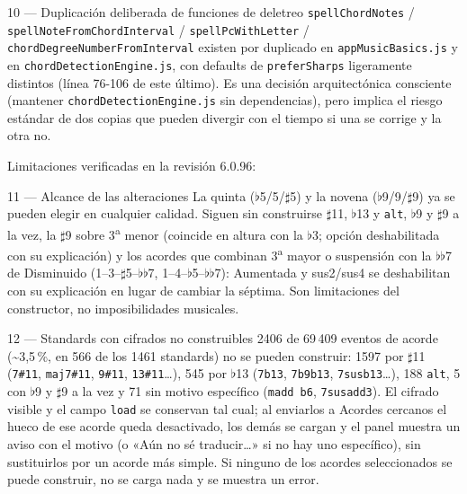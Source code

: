 \documentclass[a4paper,11pt,oneside]{report}
\newcommand{\flt}{\ensuremath{\flat}}
\newcommand{\shp}{\ensuremath{\sharp}}
\begin{document}
\begin{hallazgobox}{10 --- Duplicación deliberada de funciones de deletreo}
\lstinline!spellChordNotes! / \lstinline!spellNoteFromChordInterval! / \lstinline!spellPcWithLetter! / \lstinline!chordDegreeNumberFromInterval! existen por duplicado en \lstinline!appMusicBasics.js! y en \lstinline!chordDetectionEngine.js!, con defaults de \lstinline!preferSharps! ligeramente distintos (línea 76-106 de este último). Es una decisión arquitectónica consciente (mantener \lstinline!chordDetectionEngine.js! sin dependencias), pero implica el riesgo estándar de dos copias que pueden divergir con el tiempo si una se corrige y la otra no.
\end{hallazgobox}

\noindent Limitaciones verificadas en la revisión 6.0.96:

\begin{hallazgobox}{11 --- Alcance de las alteraciones}
La quinta (\flt5/5/\shp5) y la novena (\flt9/9/\shp9) ya se pueden elegir en cualquier calidad. Siguen sin construirse \shp11, \flt13 y \lstinline!alt!, \flt9 y \shp9 a la vez, la \shp9 sobre 3\textsuperscript{a} menor (coincide en altura con la \flt3; opción deshabilitada con su explicación) y los acordes que combinan 3\textsuperscript{a} mayor o suspensión con la \flt\flt7 de Disminuido (1--3--\shp5--\flt\flt7, 1--4--\flt5--\flt\flt7): Aumentada y sus2/sus4 se deshabilitan con su explicación en lugar de cambiar la séptima. Son limitaciones del constructor, no imposibilidades musicales.
\end{hallazgobox}

\begin{hallazgobox}{12 --- Standards con cifrados no construibles}
2406 de 69\,409 eventos de acorde (\textasciitilde3,5\,\%, en 566 de los 1461 standards) no se pueden construir: 1597 por \shp11 (\lstinline!7#11!, \lstinline!maj7#11!, \lstinline!9#11!, \lstinline!13#11!\ldots), 545 por \flt13 (\lstinline!7b13!, \lstinline!7b9b13!, \lstinline!7susb13!\ldots), 188 \lstinline!alt!, 5 con \flt9 y \shp9 a la vez y 71 sin motivo específico (\lstinline!madd b6!, \lstinline!7susadd3!). El cifrado visible y el campo \lstinline!load! se conservan tal cual; al enviarlos a Acordes cercanos el hueco de ese acorde queda desactivado, los demás se cargan y el panel muestra un aviso con el motivo (o «Aún no sé traducir\ldots» si no hay uno específico), sin sustituirlos por un acorde más simple. Si ninguno de los acordes seleccionados se puede construir, no se carga nada y se muestra un error.
\end{hallazgobox}
\end{document}

